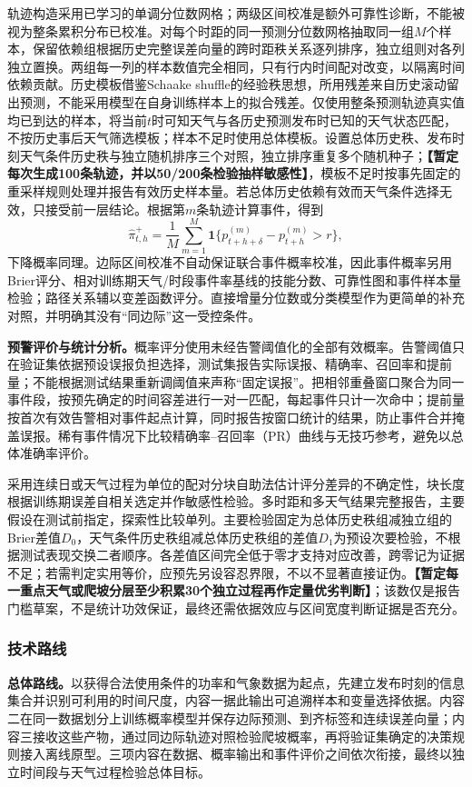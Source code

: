 轨迹构造采用已学习的单调分位数网格；两级区间校准是额外可靠性诊断，不能被视为整条累积分布已校准。对每个时距的同一预测分位数网格抽取同一组$M$个样本，保留依赖组根据历史完整误差向量的跨时距秩关系逐列排序，独立组则对各列独立置换。两组每一列的样本数值完全相同，只有行内时间配对改变，以隔离时间依赖贡献。历史模板借鉴Schaake shuffle的经验秩思想\cite{clark2004schaake,schefzik2013ecc}，所用残差来自历史滚动留出预测，不能采用模型在自身训练样本上的拟合残差。仅使用整条预测轨迹真实值均已到达的样本，将当前$t$时可知天气与各历史预测发布时已知的天气状态匹配，不按历史事后天气筛选模板；样本不足时使用总体模板。设置总体历史秩、发布时刻天气条件历史秩与独立随机排序三个对照，独立排序重复多个随机种子；\textbf{【暂定每次生成100条轨迹，并以50/200条检验抽样敏感性】}，模板不足时按事先固定的重采样规则处理并报告有效历史样本量。若总体历史依赖有效而天气条件选择无效，只接受前一层结论。根据第$m$条轨迹计算事件，得到
\[
\widehat\pi^+_{t,h}=\frac{1}{M}\sum_{m=1}^{M}
\mathbf{1}\{p^{(m)}_{t+h+\delta}-p^{(m)}_{t+h}>r\},
\]
下降概率同理。边际区间校准不自动保证联合事件概率校准，因此事件概率另用Brier评分、相对训练期天气/时段事件率基线的技能分数、可靠性图和事件样本量检验；路径关系辅以变差函数评分\cite{scheuerer2015variogram}。直接增量分位数或分类模型作为更简单的补充对照，并明确其没有“同边际”这一受控条件。

\textbf{预警评价与统计分析。}概率评分使用未经告警阈值化的全部有效概率。告警阈值只在验证集依据预设误报负担选择，测试集报告实际误报、精确率、召回率和提前量；不能根据测试结果重新调阈值来声称“固定误报”。把相邻重叠窗口聚合为同一事件段，按预先确定的时间容差进行一对一匹配，每起事件只计一次命中；提前量按首次有效告警相对事件起点计算，同时报告按窗口统计的结果，防止事件合并掩盖误报。稀有事件情况下比较精确率--召回率（PR）曲线与无技巧参考，避免以总体准确率评价。

采用连续日或天气过程为单位的配对分块自助法估计评分差异的不确定性，块长度根据训练期误差自相关选定并作敏感性检验。多时距和多天气结果完整报告，主要假设在测试前指定，探索性比较单列。主要检验固定为总体历史秩组减独立组的Brier差值$D_0$，天气条件历史秩组减总体历史秩组的差值$D_1$为预设次要检验，不根据测试表现交换二者顺序。各差值区间完全低于零才支持对应改善，跨零记为证据不足；若需判定实用等价，应预先另设容忍界限，不以不显著直接证伪。\textbf{【暂定每一重点天气或爬坡分层至少积累30个独立过程再作定量优劣判断】}；该数仅是报告门槛草案，不是统计功效保证，最终还需依据效应与区间宽度判断证据是否充分。

\subsubsection{技术路线}
\textbf{总体路线。}以获得合法使用条件的功率和气象数据为起点，先建立发布时刻的信息集合并识别可利用的时间尺度，内容一据此输出可追溯样本和变量选择依据。内容二在同一数据划分上训练概率模型并保存边际预测、到齐标签和连续误差向量；内容三接收这些产物，通过同边际轨迹对照检验爬坡概率，再将验证集确定的决策规则接入离线原型。三项内容在数据、概率输出和事件评价之间依次衔接，最终以独立时间段与天气过程检验总体目标。

